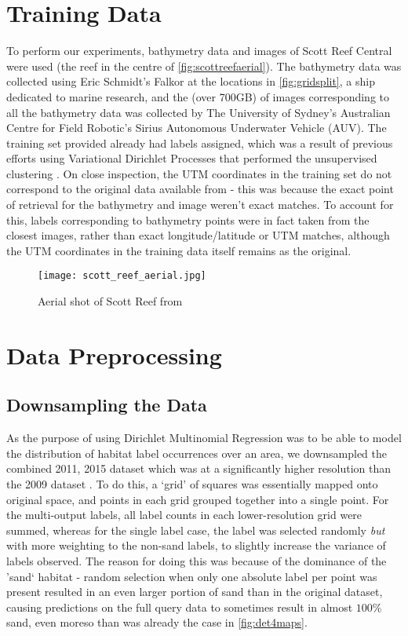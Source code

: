 \section{Training Data}
To perform our experiments, bathymetry data and images of Scott Reef Central were used (the reef in the centre of \autoref{fig:scottreefaerial}). The bathymetry data was collected using Eric Schmidt's Falkor at the locations in \autoref{fig:gridsplit}, a ship dedicated to marine research, and the (over 700GB) of images corresponding to all the bathymetry data was collected by The University of Sydney's Australian Centre for Field Robotic's Sirius Autonomous Underwater Vehicle (AUV). The training set provided already had labels assigned, which was a result of previous efforts using Variational Dirichlet Processes that performed the unsupervised clustering \citep{steinberg11}.  On close inspection, the UTM coordinates in the training set do not correspond to the original data available from \cite{squidle} - this was because the exact point of retrieval for the bathymetry and image weren't exact matches. To account for this, labels corresponding to bathymetry points were in fact taken from the closest images, rather than exact longitude/latitude or UTM matches, although the UTM coordinates in the training data itself remains as the original. 

\begin{figure}
    \texttt{[image: scott\_reef\_aerial.jpg]}
    \caption{Aerial shot of Scott Reef from \cite{NASA:SRI}}
    \label{fig:scottreefaerial}
\end{figure}

\section{Data Preprocessing}

\subsection{Downsampling the Data}
As the purpose of using Dirichlet Multinomial Regression was to be able to model the distribution of habitat label occurrences over an area, we downsampled the combined 2011, 2015 dataset which was at a significantly higher resolution than the 2009 dataset . To do this, a `grid' of squares was essentially mapped onto original space, and points in each grid grouped together into a single point. For the multi-output labels, all label counts in each lower-resolution grid were summed, whereas for the single label case, the label was selected randomly \textit{but} with more weighting to the non-sand labels, to slightly increase the variance of labels observed. The reason for doing this was because of the dominance of the 'sand` habitat - random selection when only one absolute label per point was present resulted in an even larger portion of sand than in the original dataset, causing predictions on the full query data to sometimes result in almost $100\%$ sand, even moreso than was already the case in \autoref{fig:det4maps}.

